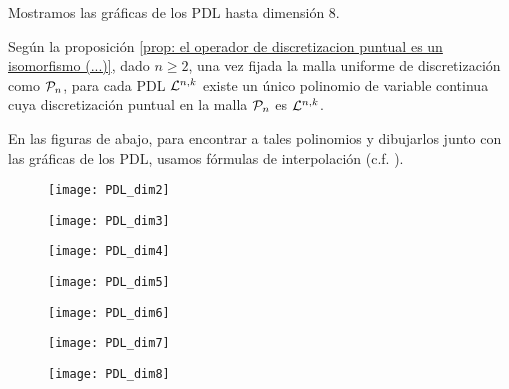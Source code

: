 Mostramos las gráficas de los PDL hasta dimensión $8$.
 
\begin{nota}
Según la proposición 
\ref{prop: el operador de discretizacion puntual es un isomorfismo (...)},
dado $n \geq 2$,
una vez fijada la malla uniforme de discretización
como $\mathcal{P}_{n}$,
para cada PDL $\mathcal{L}^{n,k}$
existe un único polinomio de variable
continua cuya discretización puntual en la
malla $\mathcal{P}_{n}$ es $\mathcal{L}^{n,k}$. \\




En las figuras de abajo, para encontrar a 
tales polinomios y dibujarlos junto con las
gráficas de los PDL, 
usamos fórmulas de interpolación (c.f. 
\cite{interpolation}).
\end{nota} 
 
\begin{figure}[H]
 	\centering
 	\texttt{[image: PDL\_dim2]} 
 \end{figure}	 

\begin{figure}[H]
 	\centering
 	\texttt{[image: PDL\_dim3]} 
 \end{figure}
 
 \begin{figure}[H]
 	\centering
 	\texttt{[image: PDL\_dim4]} 
 \end{figure}
 
  \begin{figure}[H]
 	\centering
 	\texttt{[image: PDL\_dim5]} 
 \end{figure}
 
   \begin{figure}[H]
 	\centering
 	\texttt{[image: PDL\_dim6]} 
 \end{figure}
 
   \begin{figure}[H]
 	\centering
 	\texttt{[image: PDL\_dim7]} 
 \end{figure}
 
   \begin{figure}[H]
 	\centering
 	\texttt{[image: PDL\_dim8]} 
 \end{figure}
